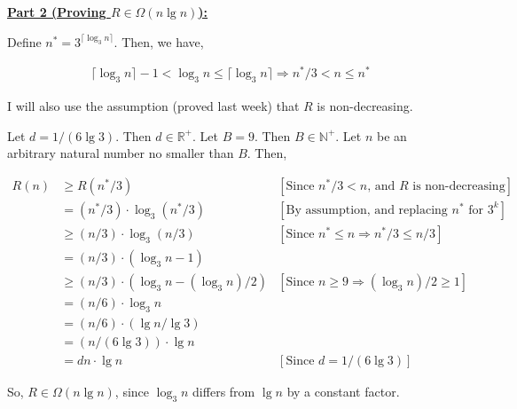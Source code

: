 \documentclass[12pt]{article}
\begin{document}
\begin{itemize}
\begin{mdframed}
    \bigskip

    \underline{\textbf{Part 2 (Proving $R \in \Omega(n \lg n)$):}}

    \bigskip

    Define $n^* = 3^{\lceil \log_3 n \rceil}$. Then, we have,

    \begin{align}
        \lceil \log_3 n \rceil - 1 < \log_3 n \leq \lceil \log_3 n \rceil \Rightarrow n^*/3 < n \leq n^*
    \end{align}

    I will also use the assumption (proved last week) that $R$ is non-decreasing.

    \bigskip

    Let $d = 1/(6\lg 3)$. Then $d \in \mathbb{R}^+$. Let $B = 9$. Then $B \in \mathbb{N}^+$. Let
    $n$ be an arbitrary natural number no smaller than $B$. Then,

    \begin{align}
    R(n) &\geq R(n^*/3) & [\text{Since $n^*/3 < n$, and $R$ is non-decreasing}]\\
    &= (n^*/3) \cdot \log_3 (n^*/3) & [\text{By assumption, and replacing $n^*$ for $3^k$}]\\
    &\geq (n/3) \cdot \log_3 (n/3) & [\text{Since $n^* \leq n \Rightarrow n^*/3 \leq n/3$}]\\
    &= (n/3) \cdot (\log_3 n - 1)\\
    &\geq (n/3) \cdot (\log_3 n - (\log_3 n)/2) & [\text{Since $n \geq 9 \Rightarrow (\log_3 n)/2 \geq 1$}]\\
    &= (n/6) \cdot \log_3 n\\
    &= (n/6) \cdot (\lg n/\lg 3)\\
    &= (n/(6\lg 3)) \cdot \lg n\\
    &= dn \cdot \lg n & [\text{Since $d = 1/(6\lg 3)$}]
    \end{align}

    So, $R \in \Omega(n \lg n)$\color{red}, since $\log_3 n$ differs from $\lg n$ by a constant factor\color{black}.
\end{mdframed}

\end{itemize}




\end{document}
